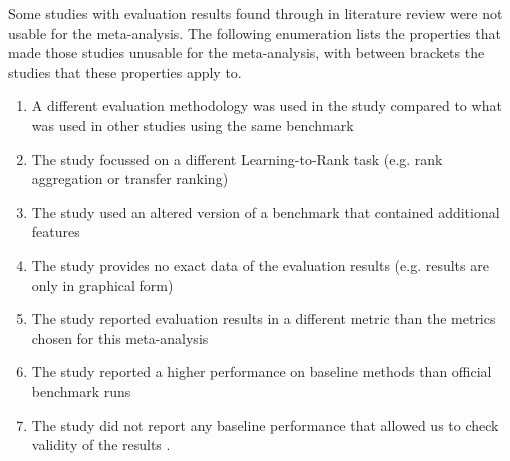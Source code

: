 Some studies with evaluation results found through in literature review were not usable for the meta-analysis. The following enumeration lists the properties that made those studies unusable for the meta-analysis, with between brackets the studies that these properties apply to.

\begin{enumerate}
\item A different evaluation methodology was used in the study compared to what was used in other studies using the same benchmark \cite{Geng2011, Lin2012}
\item The study focussed on a different Learning-to-Rank task (e.g. rank aggregation or transfer ranking) \cite{De2011, De2010, Derhami2013, De2012, Chen2010, Ah-Pine2008, Wang2009c, De2013, Miao2013, Hoi2008, De2012b, Duh2011b, Argentini2012, Qin2010c, Volkovs2013, Desarkar2011, Pan2013, Lin2011b, Volkovs2012, Dammak2011}
\item The study used an altered version of a benchmark that contained additional features \cite{Bidoki2009, Ding2010}
\item The study provides no exact data of the evaluation results (e.g. results are only in graphical form) \cite{Wang2008, Wang2010, Xu2010, Kuo2009, Li2008, Xia2008, Zhou2011, Wu2011, Zhu2009, Karimzadehgan2011, Swersky2012, Pan2011, Ni2008, Ciaramita2008, Stewart2012, Petterson2009, Agarwal2010, Chang2009, Qin2008c, Adams2011, Sculley2009, Huang2008, Alejo2010, Sun2011, He2010b, Benbouzid2012, Geng2012, Chen2012, Xu2012, Shivaswamy2011}
\item The study reported evaluation results in a different metric than the metrics chosen for this meta-analysis \cite{Yu2009, Thuy2009, Pahikkala2009, Kersting2009, Mohan2011}
\item The study reported a higher performance on baseline methods than official benchmark runs \cite{Dubey2009, Banerjee2009, Peng2010b, Song2014, Bian2010, Bian2010b, Carvalho2008, Acharyya2012, Peng2010b, Tran2012, Asadi2013c}
\item The study did not report any baseline performance that allowed us to check validity of the results \cite{Chakrabarti2008, Wang2012b, Buffoni2011}.
\end{enumerate}

